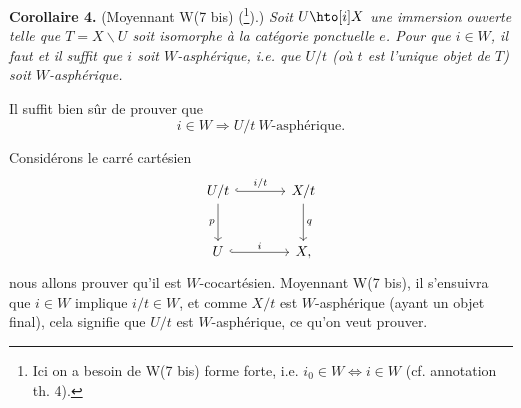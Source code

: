 
\noindent\textbf{Corollaire 4.} (Moyennant W(7 bis) (\footnote[104]{Ici on a besoin de W(7 bis) forme forte, i.e. $i_0\in W \iff i\in W$ (cf. annotation th. 4).}).) \textit{Soit $U \hto[i] X$ une immersion ouverte telle que $T=X\backslash U$ soit isomorphe à la catégorie ponctuelle $e$. Pour que $i\in W$, il faut et il suffit que $i$ soit $W$-asphérique, i.e. que $U/t$ (où $t$ est l'unique objet de $T$) soit $W$-asphérique.}

Il suffit bien sûr de prouver que
\[
i\in W \Longrightarrow U/t \ W\text{-asphérique.}
\]

Considérons le carré cartésien
\[
\begin{tikzcd}[row sep=large,column sep=large]
U/t \arrow[r, hook, "i/t"] \arrow[d, "p"'] & X/t \arrow[d, "q"] \\
U \arrow[r, hook, "i"] & X,
\end{tikzcd}
\]
nous allons prouver qu'il est $W$-cocartésien. Moyennant W(7 bis), il s'ensuivra que $i\in W$ implique $i/t\in W$, et comme $X/t$ est $W$-asphérique (ayant un objet final), cela signifie que $U/t$ est $W$-asphérique, ce qu'on veut prouver.

